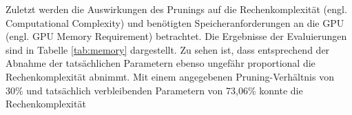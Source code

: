 Zuletzt werden die Auswirkungen des Prunings auf die Rechenkomplexität (engl.
Computational Complexity) und benötigten Speicheranforderungen an die GPU (engl.
GPU Memory Requirement) betrachtet. Die Ergebnisse der Evaluierungen sind in
Tabelle \ref{tab:memory} dargestellt. Zu sehen ist, dass entsprechend der
Abnahme der tatsächlichen Parametern ebenso ungefähr proportional die
Rechenkomplexität abnimmt. Mit einem angegebenen Pruning-Verhältnis von 30\% und
tatsächlich verbleibenden Parametern von 73,06\% konnte die Rechenkomplexität


\begin{table}[h]
	\centering
	\caption{Speicheransprüche nach dem Pruning}
	\label{tab:memory}
\end{table}
